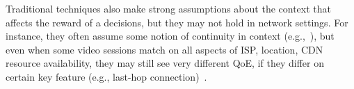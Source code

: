 \begin{packeditemize}



\item %
Traditional \mab techniques also make strong assumptions about the context
that affects the reward of a decisions, but they may not hold in network settings.
For instance, they often assume some notion of
continuity in context (e.g.,~\cite{cmab}), but even when some video sessions match on
all aspects of ISP, location, CDN resource availability, they 
may still see very different QoE, if they differ on certain key feature 
(e.g., last-hop connection)~\cite{cfa}.


\end{packeditemize}
